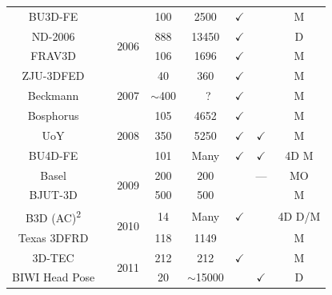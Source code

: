 \begin{table}
{\begin{tabular}{@{}cccccccc@{}}
BU3D-FE                     &\cite{Yin:2006cc}              & \multirow{4}{*}{2006} & 100         & 2500        & $\checkmark$ &              & M      \\
ND-2006                     &\cite{faltemier2007using}      &                       & 888         & 13450       & $\checkmark$ &              & D      \\
FRAV3D                      &\cite{conde2006multimodal}     &                       & 106         & 1696        & $\checkmark$ &              & M      \\
ZJU-3DFED                   &\cite{wang2006exploring}       &                       & 40          & 360         & $\checkmark$ &              & M      \\ \midrule
Beckmann                    &\cite{hu2007building}          & 2007                  & $\sim$400   &~?           & $\checkmark$ &              & M      \\ \midrule
Bosphorus                   &\cite{Savran:2008gg}           & \multirow{3}{*}{2008} & 105         & 4652        & $\checkmark$ &              & M      \\
UoY                         &\cite{heseltine2008three}      &                       & 350         & 5250        & $\checkmark$ & $\checkmark$ & M      \\
BU4D-FE                     &\cite{yin2008high}             &                       & 101         & Many        & $\checkmark$ & $\checkmark$ & 4D M   \\ \midrule
Basel                       &\cite{paysan20093d}            & \multirow{2}{*}{2009} & 200         & 200         &              & ---          & MO     \\
BJUT-3D                     &\cite{baocai2009bjut}          &                       & 500         & 500         &              &              & M      \\ \midrule
B3D (AC)\textsuperscript{2} &\cite{fanelli20103}            & \multirow{2}{*}{2010} & 14          & Many        & $\checkmark$ &              & 4D D/M \\
Texas 3DFRD                 &\cite{gupta2010anthropometric} &                       & 118         & 1149        &              &              & M      \\ \midrule
3D-TEC                      &\cite{vijayan2011twins}        & \multirow{4}{*}{2011} & 212         & 212         & $\checkmark$ &              & M      \\
BIWI Head Pose              &\cite{fanelli2013random}       &                       & 20          & $\sim$15000 &              & $\checkmark$ & D      \\

\end{tabular}}
\end{table}
